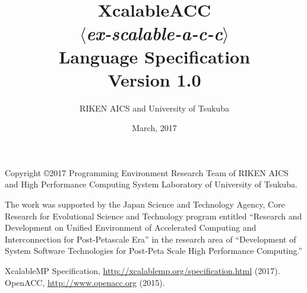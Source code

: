 \documentclass[a4paper,11pt,twoside]{report}
\title{{\Huge XcalableACC}\\
$\langle${\it ex-scalable-a-c-c}$\rangle$\\
Language Specification\\
\vspace{2cm}
Version 1.0\\}
\author{
\Large RIKEN AICS and University of Tsukuba\\
}
\date{\vspace{4cm}\Large March, 2017}
\def\XMP{XcalableMP}
\begin{document}
\maketitle

Copyright \copyright 2017 Programming Environment Research Team of RIKEN AICS
and High Performance Computing System Laboratory of University of Tsukuba.

\clearpage

\cleardoublepage

\tableofcontents

\newpage
\mbox{}\newpage

\pagestyle{fancy}
\fancyhead{} %
\fancyhead[RE]{\leftmark}
\fancyhead[LO]{\rightmark}
\fancyhead[LE,RO]{\thepage}
\fancyfoot{} %
\renewcommand{\headrulewidth}{0pt}
\renewcommand{\footrulewidth}{0pt}

 \cleardoublepage
 \cleardoublepage
 \cleardoublepage
%

The work was supported by the Japan Science and Technology Agency, 
Core Research for Evolutional Science and Technology program entitled 
``Research and Development on Unified Environment of Accelerated Computing and Interconnection for Post-Petascale Era'' 
in the research area of ``Development of System Software Technologies for Post-Peta Scale High Performance Computing.''


\begin{thebibliography}{99}
  XcalableMP Specification, \url{http://xcalablemp.org/specification.html} (2017).
  OpenACC, \url{http://www.openacc.org} (2015).
\end{thebibliography}
\end{document}
